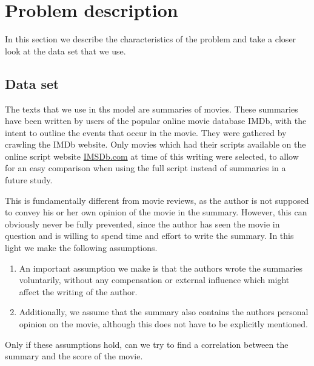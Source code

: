 \documentclass{article} %
\begin{document}
\section{Problem description}
\label{sec:problem}
In this section we describe the characteristics of the problem and take a closer look at the data set that we use.


\subsection{Data set}
The texts that we use in ths model are summaries of movies.
These summaries have been written by users of the popular online movie database IMDb, with the intent to outline the events that occur in the movie.
They were gathered by crawling the IMDb website.
Only movies which had their scripts available on the online script website \url{IMSDb.com} \cite{IMSDb} at time of this writing were selected, to allow for an easy comparison when using the full script instead of summaries in a future study.

This is fundamentally different from movie reviews, as the author is not supposed to convey his or her own opinion of the movie in the summary.
However, this can obviously never be fully prevented, since the author has seen the movie in question and is willing to spend time and effort to write the summary.
In this light we make the following assumptions.

\begin{enumerate}
  \item An important assumption we make is that the authors wrote the summaries voluntarily, without any compensation or external influence which might affect the writing of the author.
  \item Additionally, we assume that the summary also contains the authors personal opinion on the movie, although this does not have to be explicitly mentioned.
\end{enumerate}
Only if these assumptions hold, can we try to find a correlation between the summary and the score of the movie.
\end{document}
